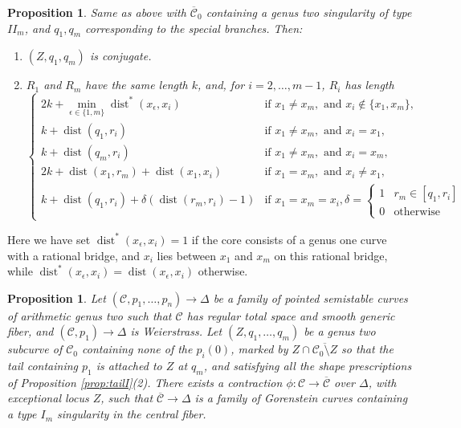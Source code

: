 \documentclass[11pt]{amsart}
\renewcommand{\to}{\rightarrow}
\newcommand{\dvr}{\Delta}
\newcommand{\dist}{\operatorname{dist}}
\theoremstyle{plain}
\newtheorem{prop}[thm]{Proposition}
\theoremstyle{definition}
\begin{document}
\begin{prop}\label{prop:tailII}
 Same as above with $\overline{\mathcal C}_0$ containing a genus two singularity of type $I\!I_m$, and $q_1,q_m$ corresponding to the special branches. Then:
 \begin{enumerate}[leftmargin=.6cm]
  \item $(Z,q_1,q_m)$ is conjugate.
  \item $R_1$ and $R_m$ have the same length $k$, and, for $i=2,\ldots,m-1$, $R_i$ has length 
  \begin{equation*}
  \begin{cases}
   2k+\min_{\epsilon\in\{1,m\}}\dist^*(x_\epsilon,x_i) & \text{if } x_1\neq x_m, \text{ and } x_i\notin\{x_1,x_m\},\\
   k+\dist(q_1, r_i)  & \text{if } x_1\neq x_m, \text{ and } x_i=x_1, \\
   k+\dist(q_m, r_i)  & \text{if } x_1\neq x_m, \text{ and } x_i=x_m, \\
   2k+\dist(x_1,r_m)+\dist(x_1,x_i) & \text{if } x_1= x_m, \text{ and } x_i\neq x_1, \\
   k+\dist(q_1, r_i)+\delta(\dist(r_m,r_i)-1)& \text{if } x_1= x_m= x_i, \delta=\begin{cases} 1 & r_m\in[q_1,r_i] \\ 0 & \text{otherwise} \end{cases}
  \end{cases} 
  \end{equation*}
 \end{enumerate}
\end{prop}
Here we have set $\dist^*(x_\epsilon,x_i)=1$ if the core consists of a genus one curve with a rational bridge, and $x_i$ lies between $x_1$ and $x_m$ on this rational bridge, while $\dist^*(x_\epsilon,x_i)=\dist(x_\epsilon,x_i)$ otherwise.
\begin{prop}\label{prop:contractionI}
 Let $(\mathcal C,p_1,\ldots,p_n)\to\dvr$ be a family of pointed semistable curves of arithmetic genus two such that $\mathcal C$ has regular total space and smooth generic fiber, and $(\mathcal C,p_1)\to \Delta$ is Weierstrass. Let $(Z,q_1,\ldots,q_m)$ be a genus two subcurve of $\mathcal C_0$ containing none of the $p_i(0)$, marked by $Z\cap \overline{\mathcal C_0\setminus Z}$ so that the tail containing $p_1$ is attached to $Z$ at $q_m$, and satisfying all the shape prescriptions of Proposition \ref{prop:tailI}(2). There exists a contraction $\phi\colon\mathcal C\to\overline{\mathcal C}$ over $\dvr$, with exceptional locus $Z$, such that $\overline{\mathcal C}\to\dvr$ is a family of Gorenstein curves containing a type $I_m$ singularity in the central fiber.
\end{prop}
\end{document}

